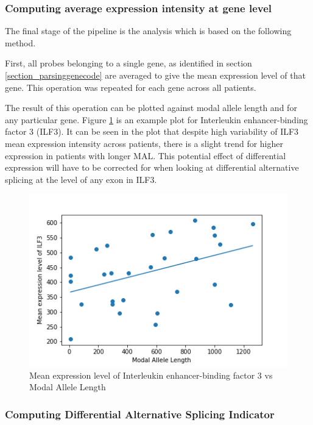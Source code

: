 \subsubsection{Computing average expression intensity at gene level}

The final stage of the pipeline is the analysis which is based on the following method.

First, all probes belonging to a single gene, as identified in section \ref{section_parsinggenecode} are averaged to give the mean expression level of that gene. This operation was repeated for each gene across all patients.

The result of this operation can be plotted against modal allele length and for any particular gene. Figure \ref{avgILF3} is an example plot for Interleukin enhancer-binding factor 3 (ILF3). It can be seen in the plot that despite high variability of ILF3 mean expression intensity across patients, there is a slight trend for higher expression in patients with longer MAL. This potential effect of differential expression will have to be corrected for when looking at differential alternative splicing at the level of any exon in ILF3.

\begin{figure}[ht] \label{avgILF3}
	\centering
	\includegraphics[width=135mm]{avgILF3.png}
	\caption{Mean expression level of Interleukin enhancer-binding factor 3 vs Modal Allele Length}
\end{figure}

\subsubsection{Computing Differential Alternative Splicing Indicator} \label{subsection_DASI}

